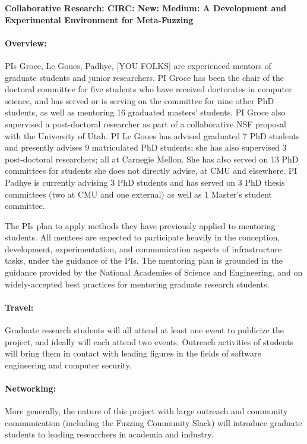 \documentclass[12pt]{article}
\begin{document}

\begin{center}
{\Large\sf\textbf{Collaborative Research: CIRC: New: Medium: A Development and 
Experimental Environment for Meta-Fuzzing}}
\end{center}

\paragraph{Overview:} PIs Groce, Le Goues, Padhye, [YOU FOLKS] are experienced mentors of graduate students and junior researchers. PI Groce has been the chair of the doctoral committee for five students who have received doctorates in computer science, and has served or is serving on the committee for nine other PhD students, as well as mentoring 16 graduated masters' students. PI Groce also supervised a post-doctoral researcher as part of a collaborative NSF proposal with the University of Utah.  PI Le Goues has advised graduated 7 PhD students and presently advises 9 matriculated PhD students; she has also supervised 3 post-doctoral researchers; all at Carnegie Mellon.  She has also served on 13 PhD committees for students she does not directly advise, at CMU and elsewhere. PI Padhye is currently advising 3 PhD students and has served on 3 PhD thesis committees (two at CMU and one external) as well as 1 Master's student committee.


The PIs plan to apply methods they have previously applied to mentoring students. All mentees are expected to participate heavily in the conception, development, experimentation, and communication aspects of infrastructure tasks, under the guidance of the PIs. The mentoring plan is grounded in the guidance provided by the National Academies of Science
and Engineering, and on widely-accepted best practices for mentoring graduate research students.


\paragraph{Travel:}  Graduate research students will all attend at least one event to  publicize the project, and ideally will each attend two events.  Outreach activities of students will bring them in contact with leading figures in the fields of software engineering and computer security.

\paragraph{Networking:}  More generally, the nature of this project with large outreach and community communication (including the Fuzzing Community Slack) will introduce graduate students to leading researchers in academia and industry.
\end{document}
